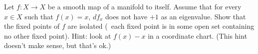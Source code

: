 Let $f:X\rightarrow X$ be a smooth map of a manifold to itself. Assume
that for every $x\in X$ such that $f(x)=x$, $df_x$ does not have $+1$
as an eigenvalue. Show that the fixed points of $f$ are isolated (\ie\
each fixed point is in some open set containing no other fixed
point). Hint: look at $f(x)-x$ in a coordinate chart. (This hint
doesn't  make sense, but that's ok.)
